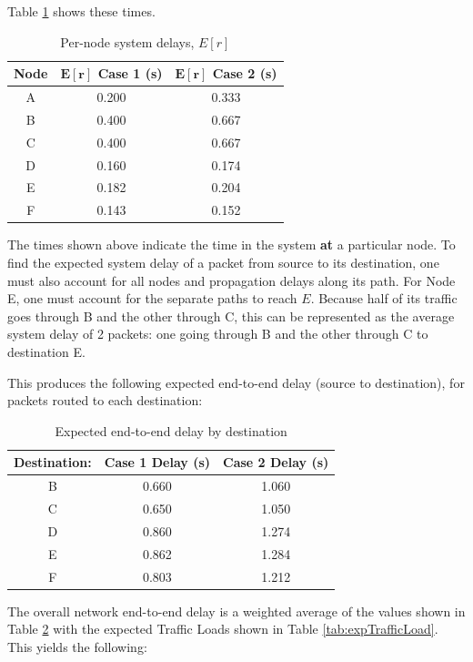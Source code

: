 \documentclass{article}
\begin{document}
Table \ref{tab:expSys} shows these times.
\newline

\begin{table}[h!]
\centering
\begin{tabular}{|c|c|c|} \hline
\textbf{Node} & \textbf{$\mathbf{E[r]}$ Case 1 (s)} & \textbf{$\mathbf{E[r]}$ Case 2 (s)} \\ \hline
A & 0.200 & 0.333 \\ \hline
B & 0.400 & 0.667 \\ \hline
C & 0.400 & 0.667 \\ \hline
D & 0.160 & 0.174 \\ \hline
E & 0.182 & 0.204 \\ \hline
F & 0.143 & 0.152 \\ \hline
\end{tabular}
\caption{Per-node system delays, $E[r]$}
\label{tab:expSys}
\end{table}

The times shown above indicate the time in the system \textbf{at} a particular node.
To find the expected system delay of a packet from source to its destination, one must also account for all nodes and propagation delays along its path.
For Node E, one must account for the separate paths to reach $E$.
Because half of its traffic goes through B and the other through C, this can be represented as the average system delay of 2 packets:  one going through B and the other through C to destination E.

This produces the following expected end-to-end delay (source to destination), for packets routed to each destination:

\begin{table}[h!]
\centering
\begin{tabular}{|c|c|c|} \hline
\textbf{Destination:} & \textbf{Case 1 Delay (s)} & \textbf{Case 2 Delay (s)} \\ \hline
B & 0.660 & 1.060 \\ \hline
C & 0.650 & 1.050 \\ \hline
D & 0.860 & 1.274 \\ \hline
E & 0.862 & 1.284 \\ \hline
F & 0.803 & 1.212 \\ \hline
\end{tabular}
\caption{Expected end-to-end delay by destination}
\label{tab:expEndDelay}
\end{table}

The overall network end-to-end delay is a weighted average of the values shown in Table \ref{tab:expEndDelay} with the expected Traffic Loads shown in Table \ref{tab:expTrafficLoad}.
This yields the following:
\newline
\end{document}
